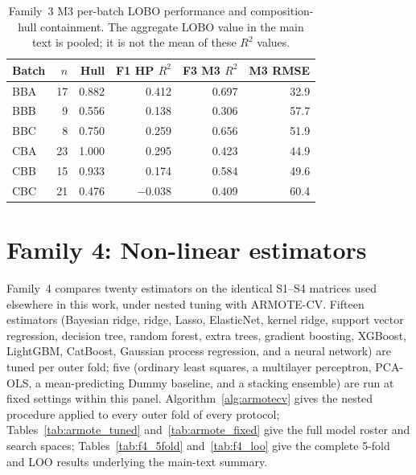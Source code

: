 \documentclass[a4paper,11pt]{article}
\newcommand{\familyfour}{Non-linear estimators}
\begin{document}
\begin{table}[H]
\centering
\caption{Family~3 M3 per-batch LOBO performance and composition-hull containment. The aggregate LOBO value in the main text is pooled; it is not the mean of these $R^2$ values.}
\label{tab:batch}
\small
\begin{tabular}{lrrrrr}
\toprule
Batch & $n$ & Hull & F1 HP $R^2$ & F3 M3 $R^2$ & M3 RMSE \\
\midrule
BBA & 17 & 0.882 & 0.412 & 0.697 & 32.9 \\
BBB & 9 & 0.556 & 0.138 & 0.306 & 57.7 \\
BBC & 8 & 0.750 & 0.259 & 0.656 & 51.9 \\
CBA & 23 & 1.000 & 0.295 & 0.423 & 44.9 \\
CBB & 15 & 0.933 & 0.174 & 0.584 & 49.6 \\
CBC & 21 & 0.476 & $-0.038$ & 0.409 & 60.4 \\
\bottomrule
\end{tabular}
\end{table}

\section{Family 4: \familyfour}
\label{si:ml}

Family~4 compares twenty estimators on the identical S1--S4 matrices used elsewhere in this work, under nested tuning with ARMOTE-CV. Fifteen estimators (Bayesian ridge, ridge, Lasso, ElasticNet, kernel ridge, support vector regression, decision tree, random forest, extra trees, gradient boosting, XGBoost, LightGBM, CatBoost, Gaussian process regression, and a neural network) are tuned per outer fold; five (ordinary least squares, a multilayer perceptron, PCA-OLS, a mean-predicting Dummy baseline, and a stacking ensemble) are run at fixed settings within this panel. 
Algorithm~\ref{alg:armotecv} gives the nested procedure applied to every outer fold of every protocol; Tables~\ref{tab:armote_tuned} and~\ref{tab:armote_fixed} give the full model roster and search spaces; Tables~\ref{tab:f4_5fold} and~\ref{tab:f4_loo} give the complete 5-fold and LOO results underlying the main-text summary.
\end{document}
